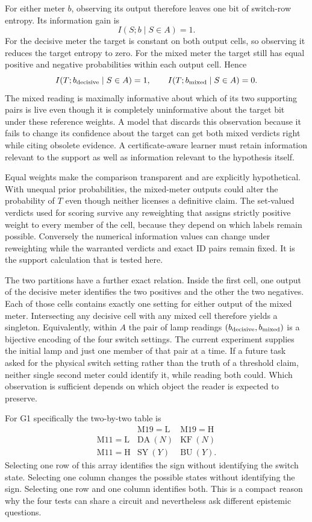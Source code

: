 \documentclass[12pt,letterpaper]{article}
\begin{document}
For either meter $b$, observing its output therefore leaves one bit of switch-row entropy. Its information gain is
\[
 I(S;b\mid S\in A)=1 .
\]
For the decisive meter the target is constant on both output cells, so observing it reduces the target entropy to zero. For the mixed meter the target still has equal positive and negative probabilities within each output cell. Hence
\[
 I(T;b_{\rm decisive}\mid S\in A)=1,\qquad
 I(T;b_{\rm mixed}\mid S\in A)=0.
\]
The mixed reading is maximally informative about which of its two supporting pairs is live even though it is completely uninformative about the target bit under these reference weights. A model that discards this observation because it fails to change its confidence about the target can get both mixed verdicts right while citing obsolete evidence. A certificate-aware learner must retain information relevant to the support as well as information relevant to the hypothesis itself.

Equal weights make the comparison transparent and are explicitly hypothetical. With unequal prior probabilities, the mixed-meter outputs could alter the probability of $T$ even though neither licenses a definitive claim. The set-valued verdicts used for scoring survive any reweighting that assigns strictly positive weight to every member of the cell, because they depend on which labels remain possible. Conversely the numerical information values can change under reweighting while the warranted verdicts and exact ID pairs remain fixed. It is the support calculation that is tested here.

The two partitions have a further exact relation. Inside the first cell, one output of the decisive meter identifies the two positives and the other the two negatives. Each of those cells contains exactly one setting for either output of the mixed meter. Intersecting any decisive cell with any mixed cell therefore yields a singleton. Equivalently, within $A$ the pair of lamp readings $(b_{\rm decisive},b_{\rm mixed})$ is a bijective encoding of the four switch settings. The current experiment supplies the initial lamp and just one member of that pair at a time. If a future task asked for the physical switch setting rather than the truth of a threshold claim, neither single second meter could identify it, while reading both could. Which observation is sufficient depends on which object the reader is expected to preserve.

For G1 specifically the two-by-two table is
\[
\begin{array}{c|cc}
 &\mathrm{M19=L}&\mathrm{M19=H}\\\hline
 \mathrm{M11=L}&\mathrm{DA}\ (N)&\mathrm{KF}\ (N)\\
 \mathrm{M11=H}&\mathrm{SY}\ (Y)&\mathrm{BU}\ (Y).
\end{array}
\]
Selecting one row of this array identifies the sign without identifying the switch state. Selecting one column changes the possible states without identifying the sign. Selecting one row and one column identifies both. This is a compact reason why the four tests can share a circuit and nevertheless ask different epistemic questions.
\end{document}
